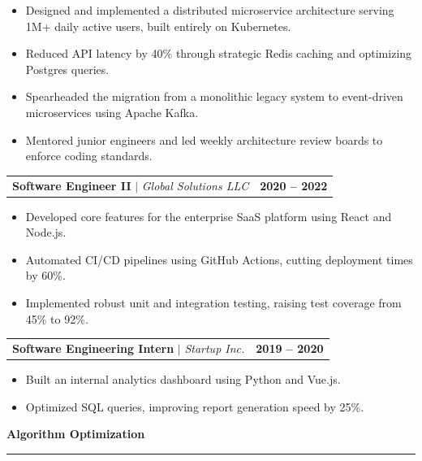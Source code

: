 \documentclass[10pt,a4paper]{article}
\begin{document}
\begin{itemize}[leftmargin=*,noitemsep]
    \item Designed and implemented a distributed microservice architecture serving 1M+ daily active users, built entirely on Kubernetes.
    \item Reduced API latency by 40\% through strategic Redis caching and optimizing Postgres queries.
    \item Spearheaded the migration from a monolithic legacy system to event-driven microservices using Apache Kafka.
    \item Mentored junior engineers and led weekly architecture review boards to enforce coding standards.
\end{itemize}

\vspace{2mm}
\noindent
\begin{tabularx}{\linewidth}{@{}Xr@{}}
\textbf{Software Engineer II} $\vert$ \textit{Global Solutions LLC} & \textbf{2020 -- 2022} \\
\end{tabularx}

\begin{itemize}[leftmargin=*,noitemsep]
    \item Developed core features for the enterprise SaaS platform using React and Node.js.
    \item Automated CI/CD pipelines using GitHub Actions, cutting deployment times by 60\%.
    \item Implemented robust unit and integration testing, raising test coverage from 45\% to 92\%.
\end{itemize}

\vspace{2mm}
\noindent
\begin{tabularx}{\linewidth}{@{}Xr@{}}
\textbf{Software Engineering Intern} $\vert$ \textit{Startup Inc.} & \textbf{2019 -- 2020} \\
\end{tabularx}

\begin{itemize}[leftmargin=*,noitemsep]
    \item Built an internal analytics dashboard using Python and Vue.js.
    \item Optimized SQL queries, improving report generation speed by 25\%.
\end{itemize}

\vspace{4mm}
\noindent\textbf{\large Algorithm Optimization} \\
\rule{\linewidth}{0.5pt}
\end{document}
